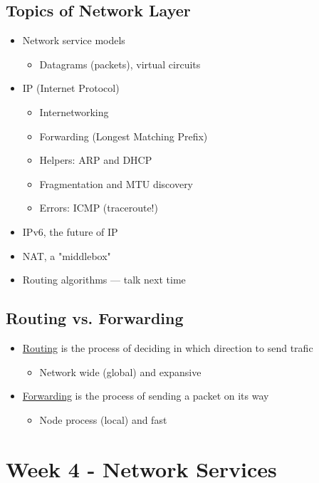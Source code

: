 \documentclass[12pt]{ctexart}   %
\begin{document}
	\subsection{ Topics of Network Layer}
	\begin{itemize}
		\item Network service models
		\begin{itemize}
			\item Datagrams (packets), virtual circuits
		\end{itemize}
		
		\item IP (Internet Protocol)
		\begin{itemize}
			\item Internetworking
			\item Forwarding (Longest Matching Prefix)
			\item Helpers: ARP and DHCP
			\item Fragmentation and MTU discovery
			\item Errors: ICMP (traceroute!)
		\end{itemize}
		
		\item IPv6, the future of IP
		\item NAT, a "middlebox"
		\item {\color{gray} Routing algorithms} --- talk next time
	\end{itemize}
	
	\subsection{Routing vs. Forwarding}
	\begin{itemize}
		\item \underline{Routing} is the process of deciding in which direction to send trafic
		\begin{itemize}
			\item Network wide (global) and expansive
		\end{itemize}
		
		\item \underline{Forwarding} is the process of sending a packet on its way
		\begin{itemize}
			\item Node process (local) and fast
		\end{itemize}
	\end{itemize}

\section{Week 4 - Network Services}	
\end{document}
